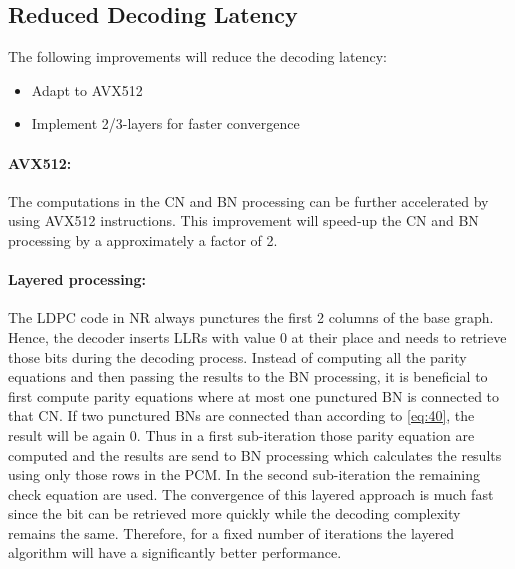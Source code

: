 \documentclass{article}
\begin{document}
\subsection{Reduced Decoding Latency}
\label{sec:reduc-decod-latency}

The following improvements will reduce the decoding latency:

\begin{itemize}
\item Adapt to AVX512
\item Implement 2/3-layers for faster convergence
\end{itemize}

\paragraph{AVX512:}
The computations in the CN and BN processing can be further accelerated by using AVX512 instructions. This improvement will speed-up the CN and BN processing by a approximately a factor of 2.

\paragraph{Layered processing:}
The LDPC code in NR always punctures the first 2 columns of the base graph. Hence, the decoder inserts LLRs with value 0 at their place and needs to retrieve those bits during the decoding process. Instead of computing all the parity equations and then passing the results to the BN processing, it is beneficial to first compute parity equations where at most one punctured BN is connected to that CN. If two punctured BNs are connected than according to \eqref{eq:40}, the result will be again 0. Thus in a first sub-iteration those parity equation are computed and the results are send to BN processing which calculates the results using only those rows in the PCM. In the second sub-iteration the remaining check equation are used.
The convergence of this layered approach is much fast since the bit can be retrieved more quickly while the decoding complexity remains the same. Therefore, for a fixed number of iterations the layered algorithm will have a significantly better performance.

\newpage


\end{document}
